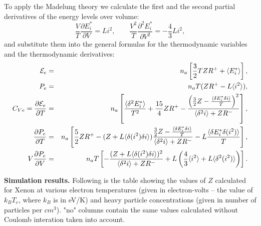 To apply the Madelung theory we calculate the first and the second partial derivatives
of the energy levels over volume:
\begin{equation}
\frac{V}{T} \frac{\partial E^*_i}{\partial V} = L i^2, \qquad
\frac{V^2}{T} \frac{\partial^2 E^*_i}{\partial V^2} = -\frac43 L i^2,
\end{equation}
and substitute them into the general formulas for the thermodynamic variables
and the thermodynamic derivatives:
\begin{eqnarray}
\label{madE}
{\cal E}_e &=& n_a\left[ \frac32 T Z R^+ + \langle E^*_i \rangle \right], \\
\label{madP}
P_e &=& n_aT ( ZR^+ - L \langle i^2 \rangle ), \\
\label{madCv}
C_{Ve} = \frac{\partial {\cal E}_e}{\partial T} &=& n_a\left[\frac{\langle\delta^2E^*_i\rangle}{T^2}+\frac{15}4ZR^+
-\frac{\left(\frac32Z-\frac{\langle\delta E^*_i\delta i\rangle}T\right)^2}{\langle\delta^2i\rangle+ZR^-}\right], \\
\label{madPT}
\frac {\partial P_e}{\partial T} &=&
n_a\left[
	\frac52 Z R^+ -
	(Z+L \langle \delta(i^2) \delta i \rangle)
		\frac{\frac32Z-\frac{\langle\delta E^*_i\delta i\rangle}T}{\langle\delta^2i\rangle+ZR^-} -
	L \frac{\langle \delta E^*_i \delta(i^2) \rangle}T
\right], \\
\label{madCompr}
V\frac{\partial P_e}{\partial V} &=&
n_a T \left[ -\frac{(Z + L \langle \delta(i^2) \delta i \rangle)^2}{\langle \delta^2 i \rangle + ZR^-} +
L \left( \frac43 \langle i^2 \rangle + L \langle \delta^2(i^2) \rangle \right) \right].
\end{eqnarray}

{\bf Simulation results.}
Following is the table showing the values of $Z$ calculated for Xenon
at various electron temperatures
(given in electron-volts -- the value of $k_{B}T_{e}$, where $k_{B}$
is in eV/K) and heavy particle concentrations (given in number of
particles per $cm^{3}$). "no" columns contain the same values
calculated without Coulomb interation taken into account.

\begin{center}

\par\end{center}

\clearpage
